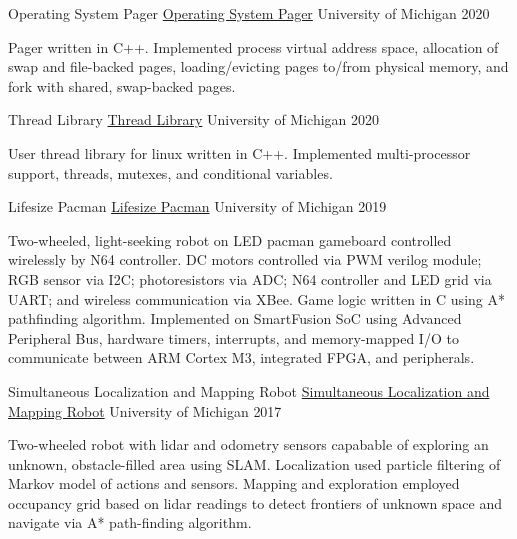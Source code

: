 \documentclass[11pt, a4paper]{cv}
\newenvironment{projects}{}{\par}
\newenvironment{cv}{}{\par}
\begin{document}
\begin{cv}
\begin{projects}
\begin{cventries}
{\begin{cvparagraph}
\end{cvparagraph}}
\cventrycompact
{\ifstrempty{}
{Operating System Pager}
{\color{hrefblue}\href{}{Operating System Pager}}}
{}
{University of Michigan}
{2020}
{\begin{cvparagraph}
Pager written in C++. Implemented process virtual address space, allocation of swap and file-backed pages, loading/evicting pages to/from physical memory, and fork with shared, swap-backed pages.
\end{cvparagraph}}
\cventrycompact
{\ifstrempty{}
{Thread Library}
{\color{hrefblue}\href{}{Thread Library}}}
{}
{University of Michigan}
{2020}
{\begin{cvparagraph}
User thread library for linux written in C++. Implemented multi-processor support, threads, mutexes, and conditional variables.
\end{cvparagraph}}
\cventrycompact
{
{Lifesize Pacman}
{\color{hrefblue}\href{https://drive.google.com/drive/folders/1HFxNVsQWryOYPgpBHcxYYqhqPPS5R\_EB}{Lifesize Pacman}}}
{}
{University of Michigan}
{2019}
{\begin{cvparagraph}
Two-wheeled, light-seeking robot on LED pacman gameboard controlled wirelessly by N64 controller. DC motors controlled via PWM verilog module; RGB sensor via I2C; photoresistors via ADC; N64 controller and LED grid via UART; and wireless communication via XBee. Game logic written in C using A* pathfinding algorithm. Implemented on SmartFusion SoC using Advanced Peripheral Bus, hardware timers, interrupts, and memory-mapped I/O to communicate between ARM Cortex M3, integrated FPGA, and peripherals.
\end{cvparagraph}}
\cventrycompact
{
{Simultaneous Localization and Mapping Robot}
{\color{hrefblue}\href{https://drive.google.com/drive/folders/1YjzT\_7qpdkZjQ76zcOCCvEo-v1gyrCbw}{Simultaneous Localization and Mapping Robot}}}
{}
{University of Michigan}
{2017}
{\begin{cvparagraph}
Two-wheeled robot with lidar and odometry sensors capabable of exploring an unknown, obstacle-filled area using SLAM. Localization used particle filtering of Markov model of actions and sensors. Mapping and exploration employed occupancy grid based on lidar readings to detect frontiers of unknown space and navigate via A* path-finding algorithm.
\end{cvparagraph}}
\cventrycompact

\end{cventries}
\end{projects}
\end{cv}
\end{document}
